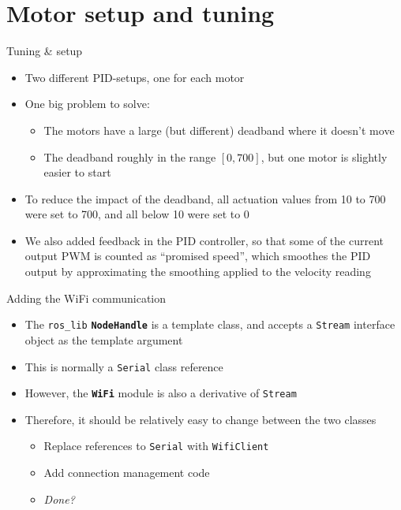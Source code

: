 \documentclass[12pt]{beamer}
\begin{document}
\section{Motor setup and tuning}
\begin{frame}{Tuning \& setup}
  \begin{itemize}
  \item<+-> Two different PID-setups, one for each motor
  \item<+-> One big problem to solve:
    \begin{itemize}
       \item<+-> The motors have a large (but different) deadband where it doesn't move
      \item<+->[$\Rightarrow$] The deadband roughly in the range $\left[0,700\right]$, but one motor is slightly easier to start
   \end{itemize}
 \item<+-> To reduce the impact of the deadband, all actuation values from 10 to 700 were set to 700, and all below 10 were set to 0
   \item<+-> We also added feedback in the PID controller, so that some of the current output PWM is counted as ``promised speed'', which smoothes the PID output by approximating the smoothing applied to the velocity reading
  \end{itemize}
  
\end{frame}


\begin{frame}{Adding the WiFi communication}
\begin{itemize}
\item<+-> The \texttt{ros\_lib} \textbf{\texttt{NodeHandle}} is a template class, and accepts a \texttt{Stream} interface object as the template argument
\item<+-> This is normally a \texttt{Serial} class reference
\item<+-> However, the \texttt{\textbf{WiFi}} module is also a derivative of \texttt{Stream}
\item<+-> Therefore, it should be relatively easy to change between the two classes  
\begin{itemize}
	\item<+-> Replace references to \texttt{Serial} with \texttt{WifiClient}
	\item<+-> Add connection management code
	\item<+-> \emph{Done?}
\end{itemize}
\end{itemize}
\end{frame}
\end{document}
